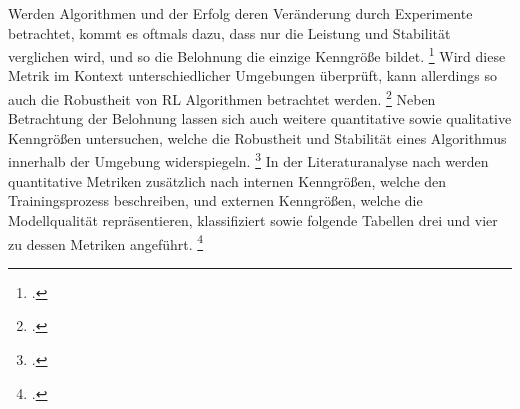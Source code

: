 Werden Algorithmen und der Erfolg deren Veränderung durch Experimente betrachtet, kommt es oftmals dazu, dass nur die Leistung und Stabilität verglichen wird, und so die Belohnung die einzige Kenngröße bildet. \footcite[Vgl.][S. 6]{YanDuan.2016} %
Wird diese Metrik im Kontext unterschiedlicher Umgebungen überprüft, kann allerdings so auch die Robustheit von RL Algorithmen betrachtet werden. \footcite[Vgl.][S. 6]{Pinto.2017}
Neben Betrachtung der Belohnung lassen sich auch weitere quantitative sowie qualitative Kenngrößen untersuchen, welche die Robustheit und Stabilität eines Algorithmus innerhalb der Umgebung widerspiegeln. \footcite[Vgl.][S. 15]{Pullum.2022}
In der Literaturanalyse nach \cite[]{Pullum.2022} werden quantitative Metriken zusätzlich nach internen Kenngrößen, welche den Trainingsprozess beschreiben, und externen Kenngrößen, welche die Modellqualität repräsentieren, klassifiziert sowie folgende Tabellen drei und vier zu dessen Metriken angeführt. \footcite[Vgl.][S. 16]{Pullum.2022}

